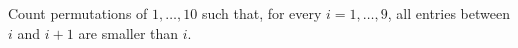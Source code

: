 Count permutations of $1,\ldots,10$ such that, for every $i=1,\ldots,9$, all entries between $i$ and $i+1$ are smaller than $i$.
